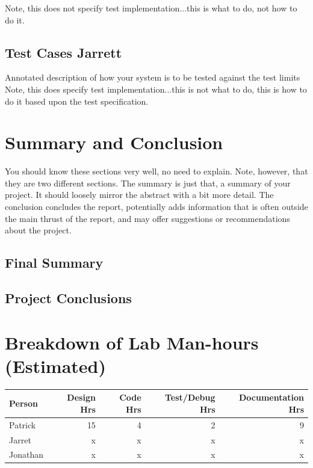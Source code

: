 \documentclass[12pt]{article} %
\begin{document}
Note, this does not specify test implementation...this is what to do, not how to do it.

\subsection{Test Cases  Jarrett}

Annotated description of how your system is to be tested against the test limits
Note, this does specify test implementation...this is not what to do, this is how to do it based upon the test specification.

\section{Summary and Conclusion}

You should know these sections very well, no need to explain.  Note, however, that they are two different sections.  The summary is just that, a summary of your project.  It should loosely mirror the abstract with a bit more detail.  The conclusion concludes the report, potentially adds information that is often outside the main thrust of the report, and may offer suggestions or recommendations about the project.

\subsection{Final Summary}


\subsection{Project Conclusions}


\pagebreak
\appendix

\section{Breakdown of Lab Man-hours (Estimated)}

\begin{tabular}{|l|*{4}{r|}}
	\hline
	Person & Design Hrs & Code Hrs & Test/Debug Hrs & Documentation Hrs \\ \hline
	Patrick & 15 & 4 & 2 & 9  \\ \hline
	Jarret & x & x & x & x  \\ \hline
	Jonathan & x & x & x & x  \\ \hline
\end{tabular}

~\\
\end{document}
